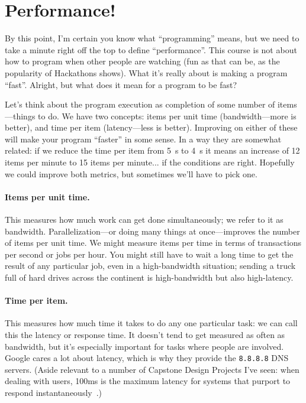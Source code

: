 




\section*{Performance!}
By this point, I'm certain you know what ``programming'' means, but we need to take a minute right off the top to define ``performance''. This course is not about how to program when other people are watching (fun as that can be, as the popularity of Hackathons shows). What it's really about is making a program ``fast''. Alright, but what does it mean for a program to be fast?

Let's think about the program execution as completion of some number of items---things to do. We have two concepts: items per unit time (bandwidth---more is better), and time per item (latency---less is better). Improving on either of these will make your program ``faster'' in some sense. In a way they are somewhat related: if we reduce the time per item from 5~s to 4~s it means an increase of 12 items per minute to 15 items per minute... if the conditions are right. Hopefully we could improve both metrics, but sometimes we'll have to pick one.

\paragraph{Items per unit time.} This measures how much work can get 
done simultaneously; we refer to it as bandwidth.
Parallelization---or doing many things at once---improves the number
of items per unit time. We might measure items per time in terms of
transactions per second or jobs per hour. You might still have to wait
a long time to get the result of any particular job, even in a
high-bandwidth situation; sending a truck full of hard drives across
the continent is high-bandwidth but also high-latency.

\paragraph{Time per item.} This measures how much time it takes to do
any one particular task: we can call this the latency or response time.
It doesn't tend to get measured as often as bandwidth, but it's especially
important for tasks where people are involved. Google cares a lot about
latency, which is why they provide the {\tt 8.8.8.8} DNS servers.
(Aside relevant to a number of Capstone Design Projects I've seen:
when dealing with users, 100ms is the maximum latency for
systems that purport to respond instantaneously~\cite{nielsen93:_respon_times}.)


